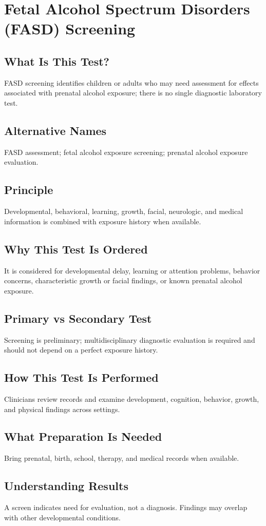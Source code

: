 \chapter{Fetal Alcohol Spectrum Disorders (FASD) Screening}
\section*{What Is This Test?} FASD screening identifies children or adults who may need assessment for effects associated with prenatal alcohol exposure; there is no single diagnostic laboratory test.
\section*{Alternative Names} FASD assessment; fetal alcohol exposure screening; prenatal alcohol exposure evaluation.
\section*{Principle} Developmental, behavioral, learning, growth, facial, neurologic, and medical information is combined with exposure history when available.
\section*{Why This Test Is Ordered} It is considered for developmental delay, learning or attention problems, behavior concerns, characteristic growth or facial findings, or known prenatal alcohol exposure.
\section*{Primary vs Secondary Test} Screening is preliminary; multidisciplinary diagnostic evaluation is required and should not depend on a perfect exposure history.
\section*{How This Test Is Performed} Clinicians review records and examine development, cognition, behavior, growth, and physical findings across settings.
\section*{What Preparation Is Needed} Bring prenatal, birth, school, therapy, and medical records when available.
\section*{Understanding Results} A screen indicates need for evaluation, not a diagnosis. Findings may overlap with other developmental conditions.
